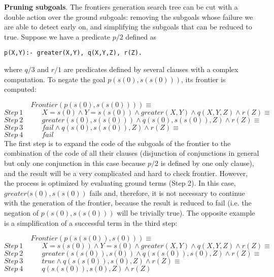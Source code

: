 \documentclass{tlp}
\begin{document}
\noindent
{\bf Pruning subgoals}. The frontiers generation search tree can be
cut with a double action over the ground subgoals: removing the
subgoals whose failure we are able to detect early on, and simplifying the
subgoals that can be reduced to true. Suppose  we have a predicate $p/2$
defined as
{\small
\begin{verbatim}
p(X,Y):- greater(X,Y), q(X,Y,Z), r(Z).
\end{verbatim}
}\noindent
where $q/3$ and $r/1$ are predicates defined by several
clauses with a complex computation. To negate
the goal $p(s(0),s(s(0)))$, its frontier is computed:

$~~~~~~~~~~~~~~~~~Frontier(p(s(0),s(s(0)))) \equiv $ \\
$Step~ 1~~~~~~~~~~~~{ X=s(0) \wedge Y=s(s(0)) \wedge
  greater(X,Y) \wedge q(X,Y,Z) \wedge r(Z) } \equiv $ \\
$Step~ 2~~~~~~~~~~~~{ greater(s(0),s(s(0))) \wedge q(s(0),s(s(0)),Z) \wedge r(Z) } \equiv $ \\
$Step~ 3~~~~~~~~~~~~{ fail  \wedge q(s(0),s(s(0)),Z) \wedge r(Z) } \equiv $ \\
$Step~ 4~~~~~~~~~~~~fail $ \\

The first step is to expand the code of the subgoals of the frontier
to the combination of the code of all their clauses (disjunction of
conjunctions in general but only one conjunction in this case because
$p/2$ is defined by one only clause), and the result will be a very
complicated and hard to check frontier.  However, the process is
optimized by evaluating ground terms (Step 2). In this case,
$greater(s(0),s(s(0))$ fails and, therefore, it is not necessary to
continue with the generation of the frontier, because the result is
reduced to fail (i.e. the negation of $p (s(0), s(s(0)))$ will be
trivially true). The opposite example is a simplification of a
successful term in the third step:

$~~~~~~~~~~~~~~~~~Frontier(p(s(s(0)),s(0))) \equiv $\\
$Step~ 1~~~~~~~~~~~~{ X=s(s(0)) \wedge Y=s(0) \wedge greater(X,Y) \wedge q(X,Y,Z) \wedge
  r(Z) } \equiv $ \\
$Step~ 2~~~~~~~~~~~~{ greater(s(s(0)),s(0)) \wedge q(s(s(0)),s(0),Z) \wedge r(Z) } \equiv
$ \\
$Step~ 3~~~~~~~~~~~~{ true \wedge q(s(s(0)),s(0),Z) \wedge r(Z) } \equiv $ \\
$Step~ 4~~~~~~~~~~~~{ q(s(s(0)),s(0),Z) \wedge r(Z) } $ \\
\end{document}

